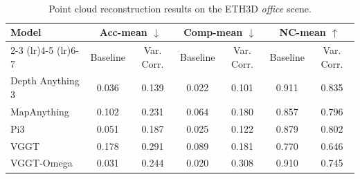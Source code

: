 
\begin{table}[H]
\centering
\caption{Point cloud reconstruction results on the ETH3D \emph{office} scene.}
\label{tab:office_pc}
\
\begin{tabular}{lcccccc}
\toprule
\multirow{2}{*}{Model} & \multicolumn{2}{c}{Acc-mean $\downarrow$} & \multicolumn{2}{c}{Comp-mean $\downarrow$} & \multicolumn{2}{c}{NC-mean $\uparrow$} \\
\cmidrule(lr){2-3} \cmidrule(lr){4-5} \cmidrule(lr){6-7}
 & Baseline & Var. Corr. & Baseline & Var. Corr. & Baseline & Var. Corr. \\
\midrule
Depth Anything 3 & 0.036 & 0.139 & 0.022 & 0.101 & 0.911 & 0.835 \\
MapAnything       & 0.102 & 0.231 & 0.064 & 0.180 & 0.857 & 0.796 \\
Pi3               & 0.051 & 0.187 & 0.025 & 0.122 & 0.879 & 0.802 \\
VGGT              & 0.178 & 0.291 & 0.089 & 0.181 & 0.770 & 0.646 \\
VGGT-Omega        & 0.031 & 0.244 & 0.020 & 0.308 & 0.910 & 0.745 \\
\bottomrule
\end{tabular}
\end{table}
